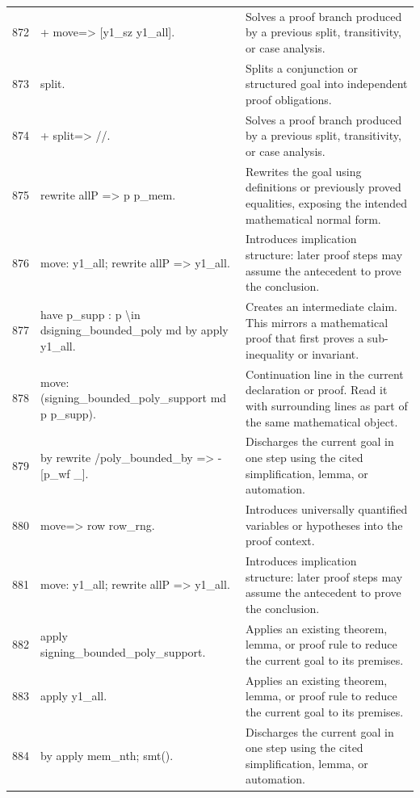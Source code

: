 \documentclass[10pt]{article}
\begin{document}
\begin{longtable}{r L{0.53\textwidth} L{0.37\textwidth}}
872 & {\ttfamily\scriptsize + move=> [y1\_sz y1\_all].} & Solves a proof branch produced by a previous split, transitivity, or case analysis. \\
873 & {\ttfamily\scriptsize   split.} & Splits a conjunction or structured goal into independent proof obligations. \\
874 & {\ttfamily\scriptsize   + split=> //.} & Solves a proof branch produced by a previous split, transitivity, or case analysis. \\
875 & {\ttfamily\scriptsize     rewrite allP => p p\_mem.} & Rewrites the goal using definitions or previously proved equalities, exposing the intended mathematical normal form. \\
876 & {\ttfamily\scriptsize     move: y1\_all; rewrite allP => y1\_all.} & Introduces implication structure: later proof steps may assume the antecedent to prove the conclusion. \\
877 & {\ttfamily\scriptsize     have p\_supp : p \textbackslash{}in dsigning\_bounded\_poly md by apply y1\_all.} & Creates an intermediate claim.  This mirrors a mathematical proof that first proves a sub-inequality or invariant. \\
878 & {\ttfamily\scriptsize     move: (signing\_bounded\_poly\_support md p p\_supp).} & Continuation line in the current declaration or proof.  Read it with surrounding lines as part of the same mathematical object. \\
879 & {\ttfamily\scriptsize     by rewrite /poly\_bounded\_by => -[p\_wf \_].} & Discharges the current goal in one step using the cited simplification, lemma, or automation. \\
880 & {\ttfamily\scriptsize   move=> row row\_rng.} & Introduces universally quantified variables or hypotheses into the proof context. \\
881 & {\ttfamily\scriptsize   move: y1\_all; rewrite allP => y1\_all.} & Introduces implication structure: later proof steps may assume the antecedent to prove the conclusion. \\
882 & {\ttfamily\scriptsize   apply signing\_bounded\_poly\_support.} & Applies an existing theorem, lemma, or proof rule to reduce the current goal to its premises. \\
883 & {\ttfamily\scriptsize   apply y1\_all.} & Applies an existing theorem, lemma, or proof rule to reduce the current goal to its premises. \\
884 & {\ttfamily\scriptsize   by apply mem\_nth; smt().} & Discharges the current goal in one step using the cited simplification, lemma, or automation. \\

\end{longtable}
\end{document}
